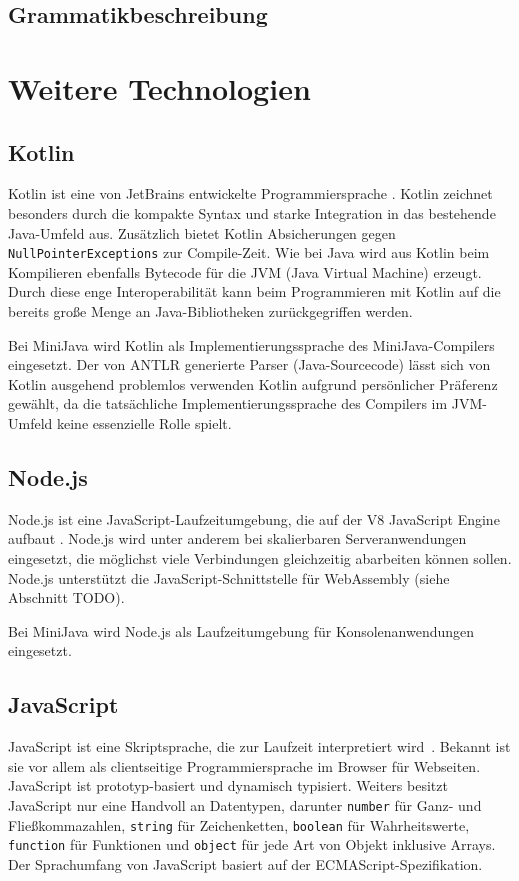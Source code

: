 \subsection{Grammatikbeschreibung}

\section{Weitere Technologien}
\subsection{Kotlin}
Kotlin ist eine von JetBrains entwickelte Programmiersprache \cite{KotlinReference}. Kotlin zeichnet besonders durch die kompakte Syntax und starke Integration in das bestehende Java-Umfeld aus. Zusätzlich bietet Kotlin Absicherungen gegen \lstinline{NullPointerExceptions} zur Compile-Zeit. Wie bei Java wird aus Kotlin beim Kompilieren ebenfalls Bytecode für die JVM (Java Virtual Machine) erzeugt. Durch diese enge Interoperabilität kann beim Programmieren mit Kotlin auf die bereits große Menge an Java-Bibliotheken zurückgegriffen werden.

Bei MiniJava wird Kotlin als Implementierungssprache des MiniJava-Compilers eingesetzt. Der von ANTLR generierte Parser (Java-Sourcecode) lässt sich von Kotlin ausgehend problemlos verwenden Kotlin aufgrund persönlicher Präferenz gewählt, da die tatsächliche Implementierungssprache des Compilers im JVM-Umfeld keine essenzielle Rolle spielt.

\subsection{Node.js}
Node.js ist eine JavaScript-Laufzeitumgebung, die auf der V8 JavaScript Engine aufbaut \cite{NodeJSDocumentation}. Node.js wird unter anderem bei skalierbaren Serveranwendungen eingesetzt, die möglichst viele Verbindungen gleichzeitig abarbeiten können sollen. Node.js unterstützt die JavaScript-Schnittstelle für WebAssembly (siehe Abschnitt TODO).

Bei MiniJava wird Node.js als Laufzeitumgebung für Konsolenanwendungen eingesetzt.

\subsection{JavaScript}
JavaScript ist eine Skriptsprache, die zur Laufzeit interpretiert wird \cite{MDNJavaScript}. Bekannt ist sie vor allem als clientseitige Programmiersprache im Browser für Webseiten. JavaScript ist prototyp-basiert und dynamisch typisiert. Weiters besitzt JavaScript nur eine Handvoll an Datentypen, darunter \lstinline{number} für Ganz- und Fließkommazahlen, \lstinline{string} für Zeichenketten, \lstinline{boolean} für Wahrheitswerte, \lstinline{function} für Funktionen und \lstinline{object} für jede Art von Objekt inklusive Arrays. Der Sprachumfang von JavaScript basiert auf der ECMAScript-Spezifikation.

